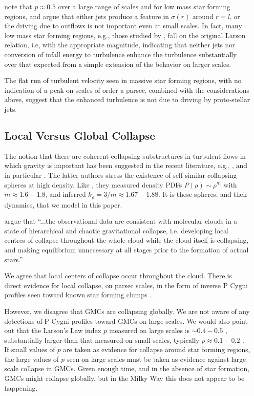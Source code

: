 \documentclass[iop,apj,numberedappendix]{emulateapj}
\begin{document}
\citet{2004ApJ...615L..45H} note that $p\approx0.5$ over a large range
of scales and for low mass star forming regions, and argue that either
jets produce a feature in $\sigma(r)$ around $r=l$, or the driving due
to outflows is not important even at small scales. In fact, many low
mass star forming regions, e.g., those studied by
\citet{1983ApJ...270..105M}, fall on the original Larson relation,
i.e, with the appropriate magnitude, indicating that neither jets nor
conversion of infall energy to turbulence enhance the turbulence
substantially over that expected from a simple extension of the
behavior on larger scales.

The flat run of turbulent velocity seen in massive star forming
regions, with no indication of a peak on scales of order a parsec,
combined with the considerations above, suggest that the enhanced
turbulence is not due to driving by proto-stellar jets.

\subsection{Local Versus Global Collapse}
The notion that there are coherent collapsing substructures in
turbulent flows in which gravity is important has been suggested in
the recent literature, e.g., \citet{2011MNRAS.411...65B}, and in
particular \citet{2012ApJ...750...13C}. The latter authors stress the
existence of self-similar collapsing spheres at high density. Like
\citet{2011ApJ...727L..20K}, they measured density PDFs $P(\rho)\sim
\rho^m$ with $m\approx1.6-1.8$, and inferred $k_\rho=3/m\approx
1.67-1.88$. It is these spheres, and their dynamics, that we model in
this paper.


\citet{2011MNRAS.411...65B} argue that
  ``...the observational data are consistent with molecular clouds in
  a state of hierarchical and chaotic gravitational collapse,
  i.e. developing local centres of collapse throughout the whole cloud
  while the cloud itself is collapsing, and making equilibrium
  unnecessary at all stages prior to the formation of actual stars.''

We agree that local centers of collapse occur throughout the
cloud. There is direct evidence for local collapse, on parsec scales,
in the form of inverse P Cygni profiles seen toward known star forming
clumps
\citep{2001ApJ...562..770D,2008ApJ...684.1273K,2011A&A...530A..53K,2011A&A...525A.151B,2013A&A...554A..83V}.

However, we disagree that GMCs are collapsing globally. We are not aware of any
detections of P Cygni profiles toward GMCs on large scales. We
would also point out that the Larson's Law index $p$ measured on large
scales is $\sim 0.4-0.5$
\citep{1981MNRAS.194..809L,2011ApJ...740..120R}, substantially larger
than that measured on small scales, typically $p\approx0.1-0.2$
\citep{1995ApJ...446..665C,1997ApJ...476..730P}. If small values of
$p$ are taken as evidence for collapse around star forming regions,
the large values of $p$ seen on large scales must be taken as evidence
against large scale collapse in GMCs. Given enough time, and in the
absence of star formation, GMCs might collapse globally, but in the
Milky Way this does not appear to be happening.
\end{document}
